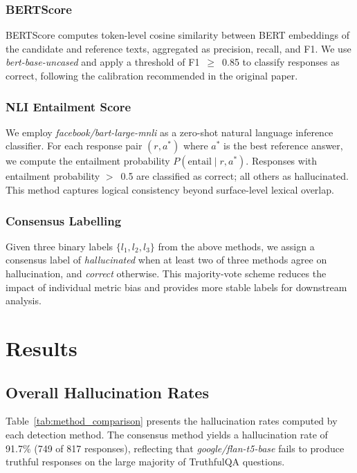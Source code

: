 \documentclass[conference]{IEEEtran}
\begin{document}
\subsubsection{BERTScore}
BERTScore \cite{zhang2020bertscore} computes token-level
cosine similarity between BERT embeddings of the candidate
and reference texts, aggregated as precision, recall,
and F1.
We use \textit{bert-base-uncased} and apply a threshold
of F1~$\geq$~0.85 to classify responses as correct,
following the calibration recommended in the original paper.

\subsubsection{NLI Entailment Score}
We employ \textit{facebook/bart-large-mnli} as a
zero-shot natural language inference classifier.
For each response pair $(r, a^*)$ where $a^*$ is the
best reference answer, we compute the entailment probability
$P(\text{entail} \mid r, a^*)$.
Responses with entailment probability $>$~0.5 are
classified as correct; all others as hallucinated.
This method captures logical consistency beyond surface-level
lexical overlap.

\subsubsection{Consensus Labelling}
Given three binary labels $\{l_1, l_2, l_3\}$ from the
above methods, we assign a consensus label of
\textit{hallucinated} when at least two of three methods
agree on hallucination, and \textit{correct} otherwise.
This majority-vote scheme reduces the impact of
individual metric bias and provides more stable labels
for downstream analysis.

\section{Results}
\label{sec:results}

\subsection{Overall Hallucination Rates}

Table~\ref{tab:method_comparison} presents the hallucination
rates computed by each detection method.
The consensus method yields a hallucination rate of 91.7\%
(749 of 817 responses), reflecting that
\textit{google/flan-t5-base} fails to produce truthful
responses on the large majority of TruthfulQA questions.
\end{document}
